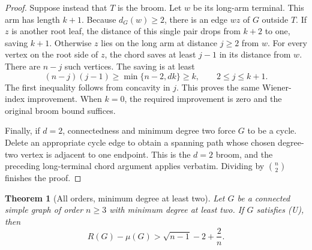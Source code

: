 \documentclass[11pt,a4paper]{article}
\newtheorem{theorem}{Theorem}[section]
\theoremstyle{remark}
\numberwithin{equation}{section}
\begin{document}
\begin{proof}
Suppose instead that \(T\) is the broom. Let \(w\) be its long-arm
terminal. This arm has length \(k+1\). Because \(d_G(w)\ge2\), there is
an edge \(wz\) of \(G\) outside \(T\). If \(z\) is another root leaf,
the distance of this single pair drops from \(k+2\) to one, saving
\(k+1\). Otherwise \(z\) lies on the long arm at distance \(j\ge2\)
from \(w\). For every vertex on the root side of \(z\), the chord saves
at least \(j-1\) in its distance from \(w\). There are \(n-j\) such
vertices. The saving is at least
\[
 (n-j)(j-1)\ge
 \min\{n-2,dk\}\ge k,\qquad 2\le j\le k+1.
\]
The first inequality follows from concavity in \(j\). This proves the
same Wiener-index improvement. When \(k=0\), the required improvement
is zero and the original broom bound suffices.

Finally, if \(d=2\), connectedness and minimum degree two force \(G\)
to be a cycle. Delete an appropriate cycle edge to obtain a spanning
path whose chosen degree-two vertex is adjacent to one endpoint.
This is the \(d=2\) broom, and the preceding long-terminal chord
argument applies verbatim. Dividing by \(\binom n2\) finishes the proof.
\end{proof}

\begin{theorem}[All orders, minimum degree at least two]
\label{thm:ch-min-degree-two}
Let \(G\) be a connected simple graph of order \(n\ge3\) with minimum
degree at least two. If \(G\) satisfies \textup{(U)}, then
\[
 R(G)-\mu(G)>\sqrt{n-1}-2+\frac2n.
\]
\end{theorem}
\end{document}
